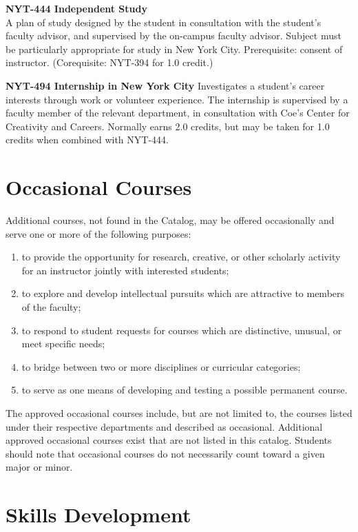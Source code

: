 \documentclass[
  letterpaper,
]{scrbook}
\providecommand{\tightlist}{%
  \setlength{\itemsep}{0pt}\setlength{\parskip}{0pt}}
\begin{document}
\textbf{NYT-444 Independent Study}\\
A plan of study designed by the student in consultation with the
student's faculty advisor, and supervised by the on-campus faculty
advisor. Subject must be particularly appropriate for study in New York
City. Prerequisite: consent of instructor. (Corequisite: NYT-394 for 1.0
credit.)

\textbf{NYT-494 Internship in New York City} Investigates a student's
career interests through work or volunteer experience. The internship is
supervised by a faculty member of the relevant department, in
consultation with Coe's Center for Creativity and Careers. Normally
earns 2.0 credits, but may be taken for 1.0 credits when combined with
NYT-444.

\section{Occasional Courses}\label{occasional-courses}

Additional courses, not found in the Catalog, may be offered
occasionally and serve one or more of the following purposes:

\begin{enumerate}
\def\labelenumi{\arabic{enumi}.}
\tightlist
\item
  to provide the opportunity for research, creative, or other scholarly
  activity for an instructor jointly with interested students;
\item
  to explore and develop intellectual pursuits which are attractive to
  members of the faculty;
\item
  to respond to student requests for courses which are distinctive,
  unusual, or meet specific needs;
\item
  to bridge between two or more disciplines or curricular categories;
\item
  to serve as one means of developing and testing a possible permanent
  course.
\end{enumerate}

The approved occasional courses include, but are not limited to, the
courses listed under their respective departments and described as
occasional. Additional approved occasional courses exist that are not
listed in this catalog. Students should note that occasional courses do
not necessarily count toward a given major or minor.

\section{Skills Development}\label{skills-development}
\end{document}
